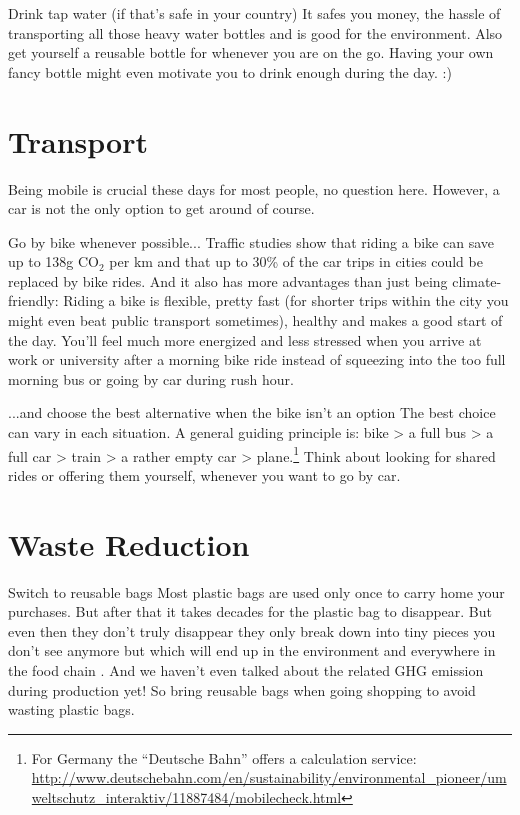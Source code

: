 \begin{suggest}{Drink tap water (if that's safe in your country)}
	It safes you money, the hassle of transporting all those heavy water bottles and is good for the environment. Also get yourself a reusable bottle for whenever you are on the go. Having your own fancy bottle might even motivate you to drink enough during the day. :)
\end{suggest}

\section{Transport}
	Being mobile is crucial these days for most people, no question here. However, a car is not the only option to get around of course.
\begin{suggest}{Go by bike whenever possible...}
	Traffic studies show that riding a bike can save up to 138g CO$_{2}$  per km and that up to 30\% of the car trips in cities could be replaced by bike rides\cite{bike}. And it also has more advantages than just being climate-friendly: Riding a bike is flexible, pretty fast (for shorter trips within the city you might even beat public transport sometimes), healthy and makes a good start of the day. You'll feel much more energized and less stressed when you arrive at work or university after a morning bike ride instead of squeezing into the too full morning bus or going by car during rush hour.
\end{suggest}

\begin{suggest}{...and choose the best alternative when the bike isn't an option}
	The best choice can vary in each situation.	A general guiding principle is: bike > a full bus > a full car > train > a rather empty car > plane.\footnote{For Germany the ``Deutsche Bahn''  offers a calculation service: \url{http://www.deutschebahn.com/en/sustainability/environmental_pioneer/umweltschutz_interaktiv/11887484/mobilecheck.html}} Think about looking for shared rides or offering them yourself, whenever you want to go by car.
\end{suggest}

\section{Waste Reduction}
\begin{suggest}{Switch to reusable bags}
	Most plastic bags are used only once to carry home your purchases. But after that it takes decades for the plastic bag to disappear. But even then they don't truly disappear they only break down into tiny pieces you don't see anymore but which will end up in the environment and everywhere in the food chain \cite{plasticbags}. And we haven't even talked about the related GHG emission during production yet! So bring reusable bags when going shopping to avoid wasting plastic bags.
\end{suggest}

